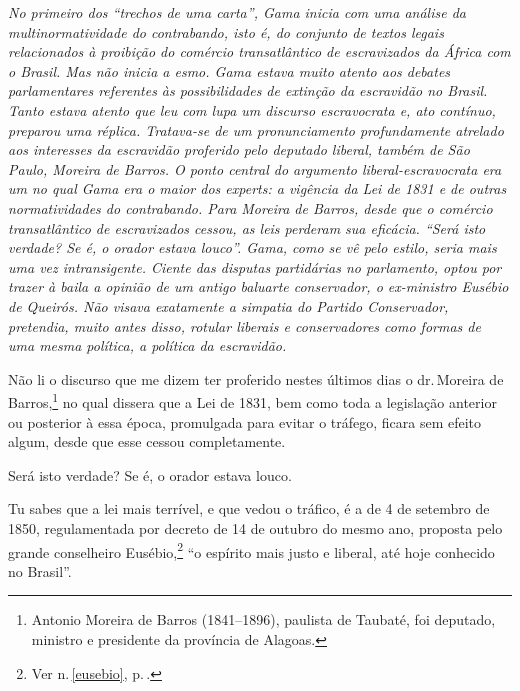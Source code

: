 
\begin{resumo}
\emph{No primeiro dos ``trechos de uma carta'', Gama inicia com uma
análise da multinormatividade do contrabando, isto é, do conjunto de
textos legais relacionados à proibição do comércio transatlântico de
escravizados da África com o Brasil. Mas não inicia a esmo. Gama estava
muito atento aos debates parlamentares referentes às possibilidades de
extinção da escravidão no Brasil. Tanto estava atento que leu com lupa
um discurso escravocrata e, ato contínuo, preparou uma réplica.
Tratava-se de um pronunciamento profundamente atrelado aos interesses da
escravidão proferido pelo deputado liberal, também de São Paulo, Moreira
de Barros. O ponto central do argumento liberal-escravocrata era um no
qual Gama era o maior dos experts: a vigência da Lei de 1831 e de outras
normatividades do contrabando. Para Moreira de Barros, desde que o
comércio transatlântico de escravizados cessou, as leis perderam sua
eficácia. ``Será isto verdade? Se é, o orador estava louco''. Gama, como
se vê pelo estilo, seria mais uma vez intransigente. Ciente das disputas
partidárias no parlamento, optou por trazer à baila a opinião de um
antigo baluarte conservador, o ex-ministro Eusébio de Queirós. Não
visava exatamente a simpatia do Partido Conservador, pretendia, muito
antes disso, rotular liberais e conservadores como formas de uma mesma
política, a política da escravidão. }
\end{resumo}

Não li o discurso que me dizem ter proferido nestes últimos dias o dr.\,Moreira de Barros,\footnote{Antonio Moreira de Barros (1841--1896),
  paulista de Taubaté, foi deputado, ministro e presidente da província
  de Alagoas.} no qual dissera que a Lei de 1831, bem como toda a
legislação anterior ou posterior à essa época, promulgada para evitar o
tráfego, ficara sem efeito algum, desde que esse cessou completamente.

Será isto verdade? Se é, o orador estava louco.

Tu sabes que a lei mais terrível, e que vedou o tráfico, é a de 4 de
setembro de 1850, regulamentada por decreto de 14 de outubro do mesmo
ano, proposta pelo grande conselheiro Eusébio,\footnote{Ver n.\,\ref{eusebio}, p.\,\pageref{eusebio}.} ``o espírito
mais justo e liberal, até hoje conhecido no Brasil''.

